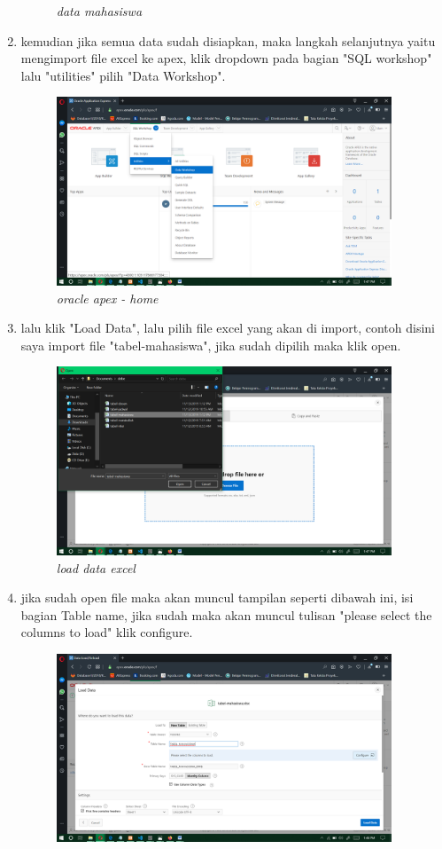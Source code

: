 \documentclass[12pt]{ociamthesis}  %
\begin{document}
\begin{enumerate}
\begin{figure}[H]
    \caption{\textit{data mahasiswa}}
    \label{foto15}
 	\end{figure}
	\item kemudian jika semua data sudah disiapkan, maka langkah selanjutnya yaitu mengimport file excel ke apex, klik dropdown pada bagian "SQL workshop" lalu "utilities" pilih "Data Workshop".
	\begin{figure}[H]
    \centering
	\includegraphics[width=10cm]{figures/load data csv/Screenshot (207).png} 
    \caption{\textit{oracle apex - home}}
    \label{foto16}
 	\end{figure}
	\item lalu klik "Load Data", lalu pilih file excel yang akan di import, contoh disini saya import file "tabel-mahasiswa", jika sudah dipilih maka klik open.
	\begin{figure}[H]
    \centering
	\includegraphics[width=10cm]{figures/load data csv/Screenshot (210).png} 
    \caption{\textit{load data excel}}
    \label{foto17}
 	\end{figure}
	\item jika sudah open file  maka akan muncul tampilan seperti dibawah ini, isi bagian Table name, jika sudah maka akan muncul tulisan "please select the columns to load" klik configure.
	\begin{figure}[H]
    \centering
	 \includegraphics[width=10cm]{figures/load data csv/Screenshot (211).png} 

\end{figure}
\end{enumerate}
\end{document}
